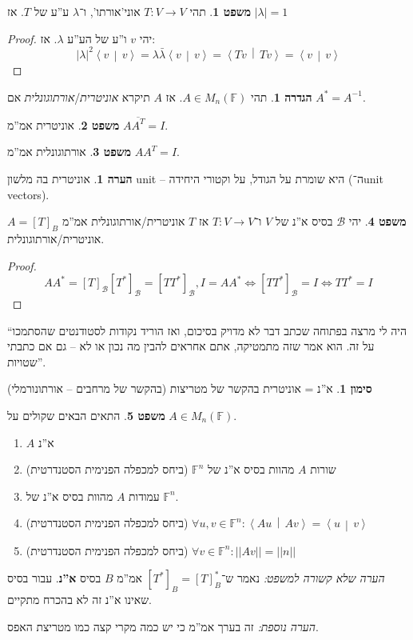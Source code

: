 \documentclass[a4paper]{article}
\newcommand\bc    {\mathcal{B}}
\newcommand\ra    {\rangle}
\newcommand\la    {\langle}
\newcommand\ol    {\overline}
\newcommand\F         {\mathbb{F}}
\newcommand\co        {\colon}
\newcommand\norm[1]   {\left \vert \left \vert #1 \right \vert \right \vert}
\newcommand\mut [2]   {\left \la #1 \,\middle\vert\, #2 \right \ra}
\renewcommand\lg      {\lambda}
\newcommand\op    {^{-1}}
\theoremstyle{definition}
\newtheorem{Theorem}{\color{myblue}משפט}
\newtheorem{Definition}{\color{mygreen}הגדרה}
\newtheorem{Remark}{\color{mycyan}הערה}
\newtheorem{Notion}{\color{myred}סימון}
\newcommand\theo  [1] {\begin{Theorem}#1\end{Theorem}}
\newcommand\defi  [1] {\begin{Definition}#1\end{Definition}}
\newcommand\rmark [1] {\begin{Remark}#1\end{Remark}}
\newcommand\noti  [1] {\begin{Notion}#1\end{Notion}}
\begin{document}
	\theo{תהי $T \co V \to V$ אוני'אורתו', ו־$\lg$ ע''ע של $T$. אז $|\lg| = 1$} \begin{proof}
		יהי $v$ ו''ע של הע''ע $\lg$. אז: 
		\[ |\lg|^2 \mut{v}{v} = \lg\bar\lg \mut{v}{v} = \mut{Tv}{Tv} = \mut{v}{v} \]
	\end{proof}
	\defi{תהי $A \in M_n(\F)$. אז $A$ תיקרא \textit{אוניטרית}/\textit{אורתוגונלית} אם $A^* = A\op$. }
	\theo{אוניטרית אמ''מ $A\ol{A^T} = I$. }
	\theo{אורתוגונלית אמ''מ $AA^T = I$. }
	\rmark{אוניטרית בה מלשון unit – היא שומרת על הגודל, על וקטורי היחידה (ה־unit vectors). }
	\theo{יהי $\bc$ בסיס א''נ של $V$ ו־$T \co V \to V$ אז $T$ אוניטרית/אורתוגונלית אמ''מ $A = [T]_B$ אוניטרית/אורתוגונלית. }
	\begin{proof}
		\[ AA^* = [T]_\bc[T^*]_\bc = [TT^*]_\bc, I = AA^* \iff [TT^*]_\bc = I \iff TT^* = I \]
	\end{proof}
	
	``היה לי מרצה בפתוחה שכתב דבר לא מדויק בסיכום, ואז הוריד נקודות לסטודנטים שהסתמכו על זה. הוא אמר שזה מתמטיקה, אתם אחראים להבין מה נכון או לא – גם אם כתבתי שטויות''. 
	
	\noti{א''נ = אוניטרית בהקשר של מטריצות (בהקשר של מרחבים – אורתונורמלי)}
	
	\theo{התאים הבאים שקולים על $A \in M_n(\F)$. 
		\begin{enumerate}
			\item $A$ א''נ
			\item שורות $A$ מהוות בסיס א''נ של $\F^n$ (ביחס למכפלה הפנימית הסטנדרטית)
			\item עמודות $A$ מהוות בסיס א''נ של $\F^n$. 
			\item (ביחס למכפלה הפנימית הסטנדרטית) \hfill $\forall u, v \in \F^n \co \mut{Au}{Av} = \mut{u}{v}$
			\item (ביחס למכפלה הפנימית הסטנדרטית) \hfill $\forall v \in \F^n \co \norm{Av} = \norm{n}$
	\end{enumerate}}
	\textit{הערה שלא קשורה למשפט: }נאמר ש־$[T^*]_B = [T]_B^*$ אמ''מ $B$ בסיס \textbf{א''נ}. עבור בסיס שאינו א''נ זה לא בהכרח מתקיים. 
	
	\textit{הערה נוספת: }זה בערך אמ''מ כי יש כמה מקרי קצה כמו מטריצת האפס. 
	
\end{document}
